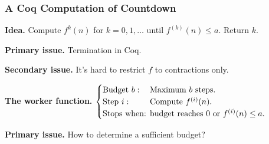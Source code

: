 \begin{frame}[fragile]
\frametitle{A Coq Computation of Countdown}
\textbf{Idea.} %
Compute $f^{k}(n)$ for $k=0, 1,\ldots$ until $f^{(k)}(n)\le a$. Return $k$.

\bigskip

\pause 
\textbf{Primary issue.} Termination in Coq.

\bigskip

\textbf{Secondary issue.} It's hard to restrict $f$ to contractions only.

\bigskip

\pause 
\textbf{The worker function.} $\begin{cases}
\text{Budget } b: & \hspace{-1em}\text{Maximum } b \text{ steps. } \\
\text{Step } i: & \hspace{-1em}\text{Compute } f^{(i)}(n). \\
\text{Stops when: } & \hspace{-1em}\text{budget reaches } 0 \text{ or } f^{(i)}(n) \le a.
\end{cases}$


\bigskip

\pause 
\textbf{Primary issue.} How to determine a sufficient budget?
\end{frame}


